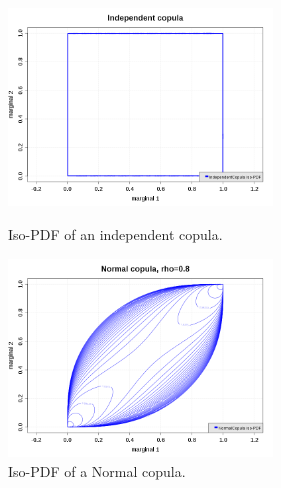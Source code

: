 \begin{figure}[H]
  \begin{minipage}{10cm}
    \begin{center}
      \includegraphics[width=7cm]{IndependentCopula.png}
      \caption{Iso-PDF of an independent copula.}
      \label{IndependentCopulaIsoPDF}
    \end{center}
  \end{minipage}
  \hfill
  \begin{minipage}{10cm}
    \begin{center}
      \includegraphics[width=7cm]{NormalCopula.png}
      \caption{Iso-PDF of a  Normal copula.}
      \label{NormalCopulaIsoPDF}
    \end{center}
  \end{minipage}
\end{figure}


